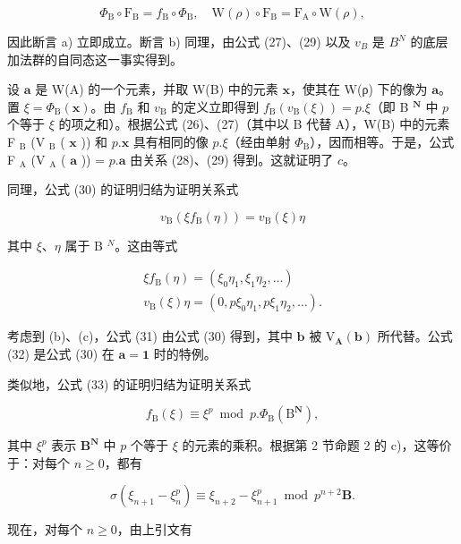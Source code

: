 \[
\Phi_ {\mathrm{B}} \circ \mathrm{F} _ {\mathrm{B}} = f _ {\mathrm{B}} \circ \Phi_ {\mathrm{B}}, \quad \mathrm{W} (\rho) \circ \mathrm{F} _ {\mathrm{B}} = \mathrm{F} _ {\mathrm{A}} \circ \mathrm{W} (\rho),
\]

因此断言 a) 立即成立。断言 b) 同理，由公式 (27)、(29) 以及 \(v_{B}\) 是 \(B^{N}\) 的底层加法群的自同态这一事实得到。

设 \(\pmb{a}\) 是 W(A) 的一个元素，并取 W(B) 中的元素 \(\pmb{x}\)，使其在 W(ρ) 下的像为 \(\pmb{a}\)。置 \(\xi = \Phi_{\mathrm{B}}(\pmb{x})\)。由 \(f_{\mathrm{B}}\) 和 \(v_{\mathrm{B}}\) 的定义立即得到 \(f_{\mathrm{B}}(v_{\mathrm{B}}(\xi)) = p.\xi\)（即 B \(^{\mathbf{N}}\) 中 \(p\) 个等于 \(\xi\) 的项之和）。根据公式 (26)、(27)（其中以 B 代替 A），W(B) 中的元素 F \(_{\mathrm{B}}\) (V \(_{\mathrm{B}}\) ( \(\pmb{x}\) )) 和 \(p.\pmb{x}\) 具有相同的像 \(p.\xi\)（经由单射 \(\Phi_{\mathrm{B}}\)），因而相等。于是，公式 F \(_{\mathrm{A}}\) (V \(_{\mathrm{A}}\) ( \(\pmb{a}\) )) = \(p.\pmb{a}\) 由关系 (28)、(29) 得到。这就证明了 \(c\)。

同理，公式 (30) 的证明归结为证明关系式

\[
v _ {\mathrm{B}} (\xi f _ {\mathrm{B}} (\eta)) = v _ {\mathrm{B}} (\xi) \eta
\]

其中 \(\xi\)、\(\eta\) 属于 B \(^{N}\)。这由等式

\[
\begin{array}{l} \xi f _ {\mathrm{B}} (\eta) = (\xi_ {0} \eta_ {1}, \xi_ {1} \eta_ {2}, \dots) \\ v _ {\mathrm{B}} (\xi) \eta = (0, p \xi_ {0} \eta_ {1}, p \xi_ {1} \eta_ {2}, \dots). \end{array}
\]

考虑到 (b)、(c)，公式 (31) 由公式 (30) 得到，其中 \(\boldsymbol{b}\) 被 \(\mathrm{V}_{\mathbf{A}}(\boldsymbol{b})\) 所代替。公式 (32) 是公式 (30) 在 \(\boldsymbol{a} = \boldsymbol{1}\) 时的特例。

类似地，公式 (33) 的证明归结为证明关系式

\[
f _ {\mathrm{B}} (\xi) \equiv \xi^ {p} \bmod p. \Phi_ {\mathrm{B}} (\mathrm{B} ^ {\mathbf {N}}),
\]

其中 \(\xi^{p}\) 表示 \(\mathbf{B}^{\mathbf{N}}\) 中 \(p\) 个等于 \(\xi\) 的元素的乘积。根据第 2 节命题 2 的 c)，这等价于：对每个 \(n \geqslant 0\)，都有

\[
\sigma \left(\xi_ {n + 1} - \xi_ {n} ^ {p}\right) \equiv \xi_ {n + 2} - \xi_ {n + 1} ^ {p} \bmod p ^ {n + 2} \mathbf {B}.
\]

现在，对每个 \(n \geqslant 0\)，由上引文有

